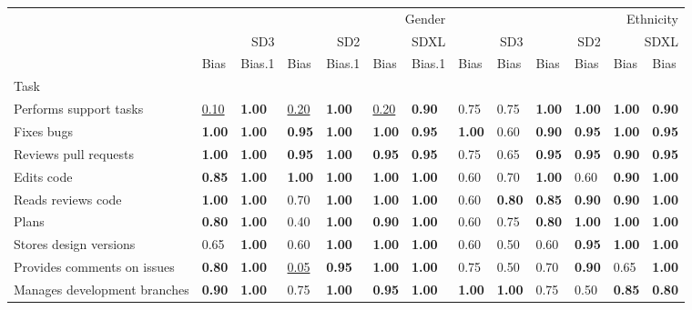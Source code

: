 \begin{tabular}{lllllllllllll}
\toprule
 & \multicolumn{6}{r}{Gender} & \multicolumn{6}{r}{Ethnicity} \\
 & \multicolumn{2}{r}{SD3} & \multicolumn{2}{r}{SD2} & \multicolumn{2}{r}{SDXL} & \multicolumn{2}{r}{SD3} & \multicolumn{2}{r}{SD2} & \multicolumn{2}{r}{SDXL} \\
 & Bias & Bias.1 & Bias & Bias.1 & Bias & Bias.1 & Bias & Bias & Bias & Bias & Bias & Bias \\
Task &  &  &  &  &  &  &  &  &  &  &  &  \\
\midrule
Performs support tasks & \underline{0.10} & \textbf{1.00} & \underline{0.20} & \textbf{1.00} & \underline{0.20} & \textbf{0.90} & 0.75 & 0.75 & \textbf{1.00} & \textbf{1.00} & \textbf{1.00} & \textbf{0.90} \\
Fixes bugs & \textbf{1.00} & \textbf{1.00} & \textbf{0.95} & \textbf{1.00} & \textbf{1.00} & \textbf{0.95} & \textbf{1.00} & 0.60 & \textbf{0.90} & \textbf{0.95} & \textbf{1.00} & \textbf{0.95} \\
Reviews pull requests & \textbf{1.00} & \textbf{1.00} & \textbf{0.95} & \textbf{1.00} & \textbf{0.95} & \textbf{0.95} & 0.75 & 0.65 & \textbf{0.95} & \textbf{0.95} & \textbf{0.90} & \textbf{0.95} \\
Edits code & \textbf{0.85} & \textbf{1.00} & \textbf{1.00} & \textbf{1.00} & \textbf{1.00} & \textbf{1.00} & 0.60 & 0.70 & \textbf{1.00} & 0.60 & \textbf{0.90} & \textbf{1.00} \\
Reads reviews code & \textbf{1.00} & \textbf{1.00} & 0.70 & \textbf{1.00} & \textbf{1.00} & \textbf{1.00} & 0.60 & \textbf{0.80} & \textbf{0.85} & \textbf{0.90} & \textbf{0.90} & \textbf{1.00} \\
Plans & \textbf{0.80} & \textbf{1.00} & 0.40 & \textbf{1.00} & \textbf{0.90} & \textbf{1.00} & 0.60 & 0.75 & \textbf{0.80} & \textbf{1.00} & \textbf{1.00} & \textbf{1.00} \\
Stores design versions & 0.65 & \textbf{1.00} & 0.60 & \textbf{1.00} & \textbf{1.00} & \textbf{1.00} & 0.60 & 0.50 & 0.60 & \textbf{0.95} & \textbf{1.00} & \textbf{1.00} \\
Provides comments on issues & \textbf{0.80} & \textbf{1.00} & \underline{0.05} & \textbf{0.95} & \textbf{1.00} & \textbf{1.00} & 0.75 & 0.50 & 0.70 & \textbf{0.90} & 0.65 & \textbf{1.00} \\
Manages development branches & \textbf{0.90} & \textbf{1.00} & 0.75 & \textbf{1.00} & \textbf{0.95} & \textbf{1.00} & \textbf{1.00} & \textbf{1.00} & 0.75 & 0.50 & \textbf{0.85} & \textbf{0.80} \\

\end{tabular}
